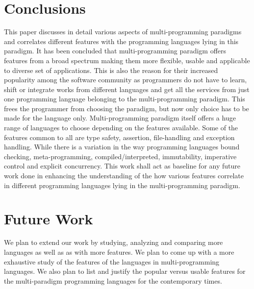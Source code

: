 \documentclass{sig-alternate}
\begin{document}
	\section{Conclusions}
	This paper discusses in detail various aspects of multi-programming paradigms and correlates different features with the programming languages lying in this paradigm. It has been concluded that multi-programming paradigm offers features from a broad spectrum making them more flexible, usable and applicable to diverse set of applications. This is also the reason for their increased popularity among the software community as programmers do not have to learn, shift or integrate works from different languages and get all the services from just one programming language belonging to the multi-programming paradigm. This frees the programmer from choosing the paradigm, but now only choice has to be made for the language only. Multi-programming paradigm itself offers a huge range of languages to choose depending on the features available. Some of the features common to all are type safety, assertion, file-handling and exception handling. While there is a variation in the way programming languages bound checking, meta-programming, compiled/interpreted, immutability, imperative control and explicit concurrency. This work shall act as baseline for any future work done in enhancing the understanding of the how various features correlate in different programming languages lying in the multi-programming paradigm.
	
	\section{Future Work}
	We plan to extend our work by studying, analyzing and comparing more languages as well as as with more features. We plan to come up with a more exhaustive study of the features of the languages in multi-programming languages. We also plan to list and justify the popular versus usable features for the multi-paradigm programming languages for the contemporary times. 
	





\cleardoublepage %
\renewcommand*{\bibname}{References}
\end{document}
